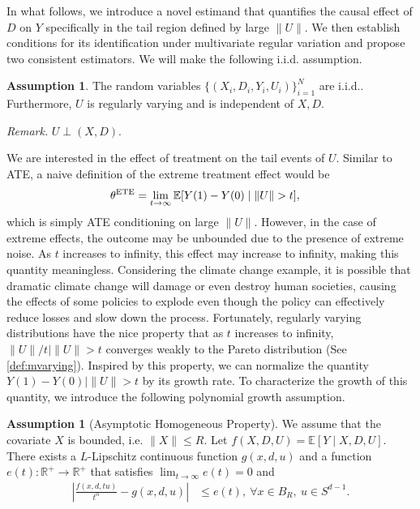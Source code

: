 \documentclass[12pt]{article}
\theoremstyle{plain}
\theoremstyle{definition}
\newtheorem{assumption}[theorem]{Assumption}
\begin{document}
In what follows, we introduce a novel estimand that quantifies the causal effect of $D$ on $Y$ specifically in the tail region defined by large $\|U\|$.  We then establish conditions for its identification under multivariate regular variation and propose two consistent estimators. We will make the following i.i.d. assumption. 
\begin{assumption}
  \label{assump:iid}
  The random variables $\{(X_i, D_i, Y_i, U_i)\}_{i = 1}^N$ are i.i.d.. Furthermore, $U$ is regularly varying and is independent of $X, D$. 
\end{assumption}

\noindent\textit{Remark.} $U\perp(X,D)$.


 We are interested in the effect of treatment on the tail events of $U$. Similar to ATE, a naive definition of the extreme treatment effect would be
\begin{align} \label{eq:ete}
  \theta^{\tmop{ETE}} & = \lim_{t \rightarrow \infty} \mathbb{E}[Y(1) - Y(0) \mid \|U\|> t],
\end{align}
which is simply ATE conditioning on large $ \|U\| $. However, in the case of extreme effects, the outcome may be unbounded due to the presence of extreme noise. As $t$ increases to infinity, this effect may increase to infinity, making this quantity meaningless. Considering the climate change example, it is possible that dramatic climate change will damage or even destroy human societies, causing the effects of some policies to explode even though the policy can effectively reduce losses and slow down the process. Fortunately, regularly varying distributions have the nice property that as $t$ increases to infinity, $\|U\|/ t \mid \|U\|> t$ converges weakly to the Pareto distribution (See \cref{def:mvarying}). Inspired by this property, we can normalize the quantity $ Y(1) - Y(0) \mid \|U\| > t $ by its growth rate. To characterize the growth of this quantity, we introduce the following polynomial growth assumption.
\begin{assumption}[Asymptotic Homogeneous Property]\label{assump:f_homo}
  We assume that the covariate $X$ is bounded, i.e. $\|X\| \leqslant R$. Let $f (X, D, U) =\mathbb{E}[Y \mid X, D, U]$. There exists a $L$-Lipschitz continuous function $g (x,
  d, u)$ and a function $e (t) : \mathbb{R}^+ \rightarrow \mathbb{R}^+$ that satisfies $\lim_{t \rightarrow \infty} e (t) = 0$ and
  \begin{align*}
    | \frac{f (x, d, tu)}{t^{\alpha}} - g (x, d, u) | & \leqslant e (t), \ \forall x \in B_R,\  u \in S^{d - 1}.
  \end{align*}
\end{assumption}
\end{document}
